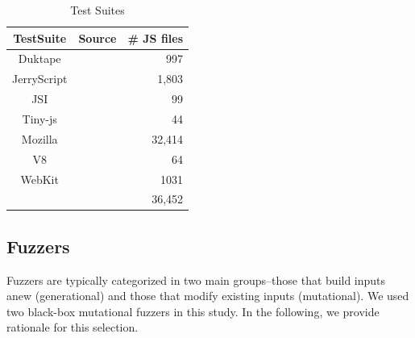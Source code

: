 \documentclass[10pt,conference,anonymous]{IEEEtran}
\begin{document}
\begin{table}[t]
  \centering
  \caption{\label{tab:test-suites}Test Suites
  }
  \begin{tabular}{ccr}
    \toprule
    TestSuite & Source & \# JS files \\
    \midrule
    Duktape & \cite{duktape} & 997 \\
    JerryScript & \cite{jerryscript} & 1,803 \\
    JSI & \cite{jsi} & 99 \\
    Tiny-js & \cite{tinyjs} & 44 \\
    Mozilla & \cite{mozilla} & 32,414 \\
    V8 & \cite{v8} & 64 \\
    WebKit & \cite{webkit} & 1031 \\
    \midrule
     &  & 36,452 \\
   \bottomrule     
  \end{tabular}
\end{table}


\subsection{Fuzzers}
\label{sec:objects:fuzzers}


Fuzzers are typically categorized in two main groups--those that build
inputs anew (generational) and those that modify existing inputs
(mutational). We used two black-box mutational
fuzzers
in this study. In the following, we provide rationale for this
selection.
\end{document}
